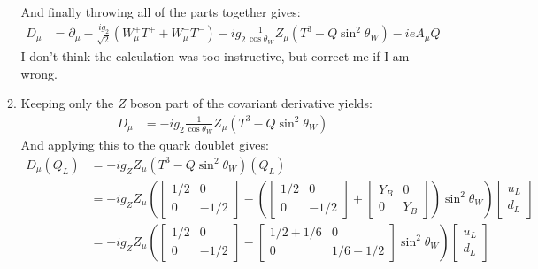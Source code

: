\documentclass[12pt,a4]{article}
\begin{document}
\begin{enumerate}
\begin{enumerate}
\begin{align*}
        \end{align*}
        And finally throwing all of the parts together gives:
        \begin{align*}
          D_\mu &= \partial_\mu - \frac{ig_2}{\sqrt{2}} (W^+_\mu T^+ + W^-_\mu T^-) -ig_2 \frac{1}{\cos \theta_W }Z_\mu (T^3 - Q \sin^2 \theta_W) - i e A_\mu Q
        \end{align*}
        I don't think the calculation was too instructive, but correct me if I am wrong.
      \item
        Keeping only the $Z$ boson part of the covariant derivative yields:
        \begin{align*}
          D_\mu &= - ig_2 \frac{1}{\cos \theta_W }Z_\mu (T^3 - Q \sin^2 \theta_W)
        \end{align*}
        And applying this to the quark doublet gives:
        \begin{align*}
          D_\mu(Q_L) &= - ig_Z Z_\mu (T^3 - Q \sin^2 \theta_W) (Q_L)\\
                     &= - ig_Z Z_\mu \left(\left[\begin{matrix} 1/2 & 0 \\ 0 & -1/2\end{matrix}\right] - \left(\left[\begin{matrix} 1/2 & 0 \\ 0 & -1/2\end{matrix}\right] + \left[\begin{matrix} Y_B & 0 \\ 0 & Y_B\end{matrix}\right]\right) \sin^2 \theta_W\right) \left[\begin{matrix} u_L \\ d_L\end{matrix}\right]\\
                     &= - ig_Z Z_\mu \left(\left[\begin{matrix} 1/2 & 0 \\ 0 & -1/2\end{matrix}\right] - \left[\begin{matrix} 1/2 + 1/6 & 0 \\ 0 & 1/6 - 1/2\end{matrix}\right]  \sin^2 \theta_W\right) \left[\begin{matrix} u_L \\ d_L\end{matrix}\right]\\

\end{align*}
\end{enumerate}
\end{enumerate}
\end{document}
